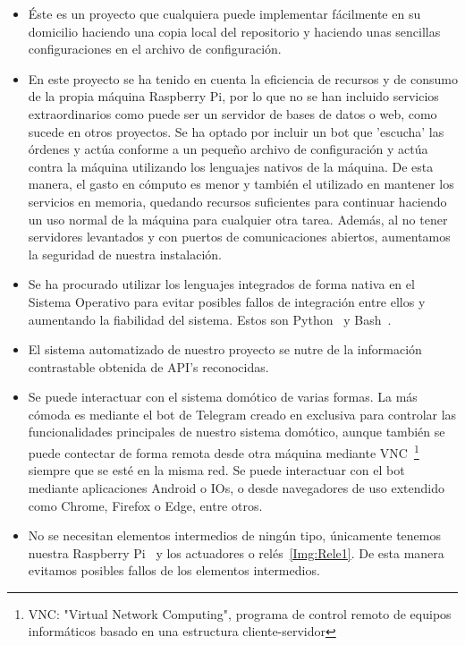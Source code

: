 \begin{itemize}
\tightlist
\item
    Éste es un proyecto que cualquiera puede implementar fácilmente en su domicilio haciendo una copia local del repositorio y haciendo unas sencillas configuraciones en el archivo de configuración.
    
\item
    En este proyecto se ha tenido en cuenta la eficiencia de recursos y de consumo de la propia máquina Raspberry Pi\cite{misc:RbPWeb}, por lo que no se han incluido servicios extraordinarios como puede ser un servidor de bases de datos o web, como sucede en otros proyectos. Se ha optado por incluir un bot que 'escucha' las órdenes y actúa conforme a un pequeño archivo de configuración y actúa contra la máquina utilizando los lenguajes nativos de la máquina. De esta manera, el gasto en cómputo es menor y también el utilizado en mantener los servicios en memoria, quedando recursos suficientes para continuar haciendo un uso normal de la máquina para cualquier otra tarea.
    Además, al no tener servidores levantados y con puertos de comunicaciones abiertos, aumentamos la seguridad de nuestra instalación.

\item
    Se ha procurado utilizar los lenguajes integrados de forma nativa en el Sistema Operativo para evitar posibles fallos de integración entre ellos y aumentando la fiabilidad del sistema. Estos son Python~\cite{misc:Python} y Bash~\cite{misc:Linux}. 
    
\item
    El sistema automatizado de nuestro proyecto se nutre de la información contrastable obtenida de API's reconocidas.
    
\item
    Se puede interactuar con el sistema domótico de varias formas. La más cómoda es mediante el bot de Telegram creado en exclusiva para controlar las funcionalidades principales de nuestro sistema domótico, aunque también se puede contectar de forma remota desde otra máquina mediante VNC~\footnote{VNC: "Virtual Network Computing", programa de control remoto de equipos informáticos basado en una estructura cliente-servidor} siempre que se esté en la misma red. Se puede interactuar con el bot mediante aplicaciones Android o IOs, o desde navegadores de uso extendido como Chrome, Firefox o Edge, entre otros.
    
\item
    No se necesitan elementos intermedios de ningún tipo, únicamente tenemos nuestra Raspberry Pi~\cite{misc:RbPWeb} y los actuadores o relés~\ref{Img:Rele1}. De esta manera evitamos posibles fallos de los elementos intermedios.
    \begin{comment}
        --> TODO: Esta situación podemos comprobarla en la imagen PLANO GENERAL DE LA INSTALACIÓN
    \end{comment}
    

\end{itemize}
